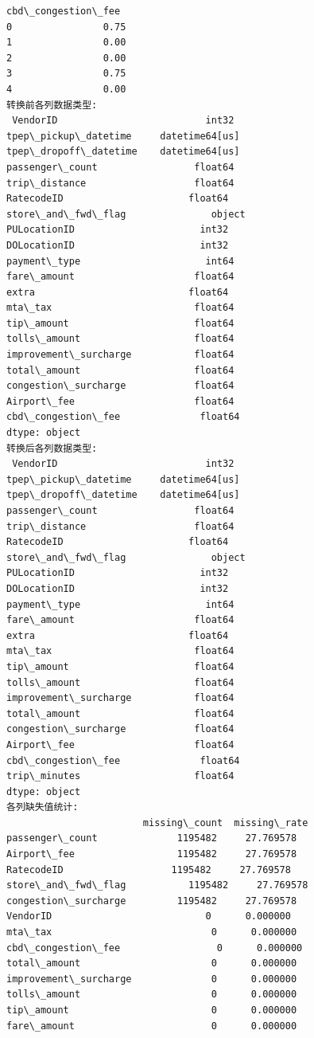 \documentclass[11pt]{article}
\begin{document}
\begin{Verbatim}[commandchars=\\\{\}]
   cbd\_congestion\_fee
0                0.75
1                0.00
2                0.00
3                0.75
4                0.00
转换前各列数据类型:
 VendorID                          int32
tpep\_pickup\_datetime     datetime64[us]
tpep\_dropoff\_datetime    datetime64[us]
passenger\_count                 float64
trip\_distance                   float64
RatecodeID                      float64
store\_and\_fwd\_flag               object
PULocationID                      int32
DOLocationID                      int32
payment\_type                      int64
fare\_amount                     float64
extra                           float64
mta\_tax                         float64
tip\_amount                      float64
tolls\_amount                    float64
improvement\_surcharge           float64
total\_amount                    float64
congestion\_surcharge            float64
Airport\_fee                     float64
cbd\_congestion\_fee              float64
dtype: object
转换后各列数据类型:
 VendorID                          int32
tpep\_pickup\_datetime     datetime64[us]
tpep\_dropoff\_datetime    datetime64[us]
passenger\_count                 float64
trip\_distance                   float64
RatecodeID                      float64
store\_and\_fwd\_flag               object
PULocationID                      int32
DOLocationID                      int32
payment\_type                      int64
fare\_amount                     float64
extra                           float64
mta\_tax                         float64
tip\_amount                      float64
tolls\_amount                    float64
improvement\_surcharge           float64
total\_amount                    float64
congestion\_surcharge            float64
Airport\_fee                     float64
cbd\_congestion\_fee              float64
trip\_minutes                    float64
dtype: object
各列缺失值统计:
                        missing\_count  missing\_rate
passenger\_count              1195482     27.769578
Airport\_fee                  1195482     27.769578
RatecodeID                   1195482     27.769578
store\_and\_fwd\_flag           1195482     27.769578
congestion\_surcharge         1195482     27.769578
VendorID                           0      0.000000
mta\_tax                            0      0.000000
cbd\_congestion\_fee                 0      0.000000
total\_amount                       0      0.000000
improvement\_surcharge              0      0.000000
tolls\_amount                       0      0.000000
tip\_amount                         0      0.000000
fare\_amount                        0      0.000000

\end{Verbatim}
\end{document}
